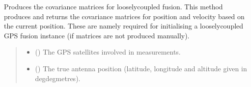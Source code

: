 \documentclass[letterpaper,10pt,english]{sphinxmanual}
\begin{document}

\begin{fulllineitems}
\label{\detokenize{modules/gps/fusion:qnav.gps.fusion.calculate_cov_mat}}
\pysigstartsignatures
{}
\pysigstopsignatures
\sphinxAtStartPar
Produces the covariance matrices for loosely\sphinxhyphen{}coupled fusion.
This method produces and returns the covariance matrices for position
and velocity based on the current position. These are namely required
for initialising a loosely\sphinxhyphen{}coupled GPS fusion instance (if matrices
are not produced manually).
\begin{quote}\begin{description}
\begin{itemize}
\item {} 
\sphinxAtStartPar
{} (\sphinxstyleliteralemphasis{\sphinxupquote{{[}}}{\hyperref[\detokenize{modules/gps/satellite:qnav.gps.satellite.Satellite}]{\sphinxcrossref{\sphinxstyleliteralemphasis{\sphinxupquote{Satellite}}}}}\sphinxstyleliteralemphasis{\sphinxupquote{{]}}}) \textendash{} The GPS satellites involved in measurements.

\item {} 
\sphinxAtStartPar
{} (\sphinxstyleliteralemphasis{\sphinxupquote{ (}}\sphinxstyleliteralemphasis{\sphinxupquote{)}}) \textendash{} The true antenna position (latitude, longitude
and altitude given in deg\sphinxhyphen{}deg\sphinxhyphen{}metres).


\end{itemize}
\end{description}
\end{quote}
\end{fulllineitems}
\end{document}
